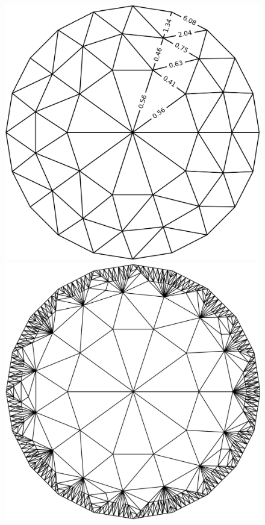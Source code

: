     \begin{figure}
        \centering
        \includegraphics[width=0.85\columnwidth]{../images/hyperbolic_disc_before_refinement_some_labels.png}
        \label{fig:hyper_before}
        \includegraphics[width=0.85\columnwidth]{../images/hyperbolic_disc_after_refinement.png}
        \label{fig:hyper_after}

\end{figure}
